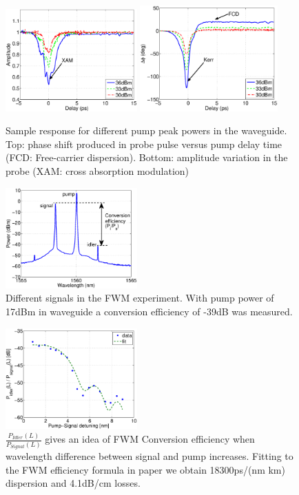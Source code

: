 \documentclass[conference]{IEEEtran}
\begin{document}
\begin{figure}[htb]
    \centering
    \includegraphics[width=0.45\textwidth]{p01amp_text}
	\includegraphics[width=0.47\textwidth]{p01phase_text}
    \caption{Sample response for different pump peak powers in the waveguide. Top: phase shift produced in probe pulse versus pump delay time (FCD: Free-carrier dispersion). Bottom: amplitude variation in the probe (XAM: cross absorption modulation)}
    \label{fig:p01}
\end{figure}

\begin{figure}[htb]
    \centering
    \includegraphics[width=0.45\textwidth]{maxEfficiency}
    \caption{Different signals in the FWM experiment. With pump power of 17dBm in waveguide a conversion efficiency of -39dB was measured.}
    \label{fig:fwmMaxEfficiency}
\end{figure}


\begin{figure}[htb]
    \centering
    \includegraphics[width=0.45\textwidth]{fwmBwfit_big}
    \caption{$ \frac{P_{Idler}(L)}{P_{Signal}(L)}$ gives an idea of FWM Conversion efficiency when wavelength difference between signal and pump increases. Fitting to the FWM efficiency formula in paper \cite{Vallaitis} we obtain 18300ps/(nm km) dispersion and 4.1dB/cm losses.}
    \label{fig:fwmBw}
\end{figure}
\end{document}
